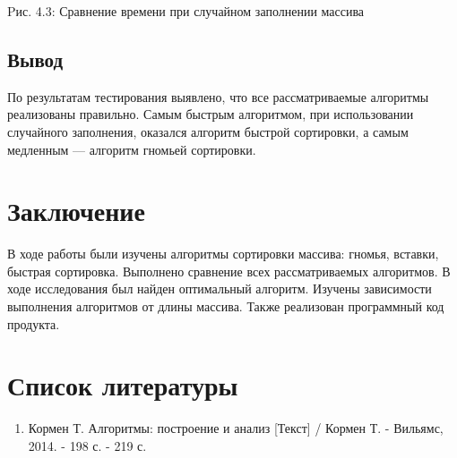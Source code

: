 \documentclass[12pt]{report}
\begin{document}
	
	\begin{center}
		Pис. 4.3: Сравнение времени при случайном заполнении массива
	\end{center}
	
	\section{Вывод}
	По результатам тестирования выявлено, что все рассматриваемые алгоритмы реализованы правильно. Самым быстрым алгоритмом, при использовании случайного заполнения, оказался алгоритм быстрой сортировки, а самым медленным — алгоритм гномьей сортировки.
	
	\chapter*{Заключение}
	В ходе работы были изучены алгоритмы сортировки массива: гномья, вставки, быстрая сортировка. Выполнено сравнение всех рассматриваемых алгоритмов. В ходе исследования был найден оптимальный алгоритм. Изучены зависимости выполнения алгоритмов от длины массива. Также реализован программный код продукта.
	
	
	\chapter*{Список литературы}
	\begin{enumerate}
		\item Кормен Т. Алгоритмы: построение и анализ [Текст] / Кормен Т. - Вильямс, 2014. - 198 с. - 219 с.
	\end{enumerate}
\end{document}
